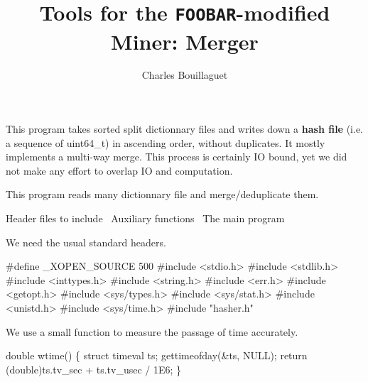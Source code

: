 \documentclass{article}%
\begin{document}
\title{Tools for the \texttt{FOOBAR}-modified Miner: Merger}
\author{Charles Bouillaguet}

\maketitle

This program takes sorted split dictionnary files and writes down a
\textbf{hash file} (i.e. a sequence of {\Tt{}uint64{\_}t\nwendquote}) in ascending order,
without duplicates. It mostly implements a multi-way merge. This process is
certainly IO bound, yet we did not make any effort to overlap IO and
computation.


This program reads many dictionnary file and merge/deduplicate them.

\nwenddocs{}\endmoddef\nwstartdeflinemarkup\nwenddeflinemarkup
\LA{}Header files to include~{\nwtagstyle{}}\RA{}
\LA{}Auxiliary functions~{\nwtagstyle{}}\RA{}
\LA{}The main program~{\nwtagstyle{}}\RA{}

\nwnotused{*}\nwendcode{}We need the usual standard headers.

\nwenddocs{}\endmoddef\nwstartdeflinemarkup{}\nwenddeflinemarkup
#define _XOPEN_SOURCE 500
#include <stdio.h>
#include <stdlib.h>
#include <inttypes.h>
#include <string.h>
#include <err.h>
#include <getopt.h>
#include <sys/types.h>
#include <sys/stat.h>
#include <unistd.h>
#include <sys/time.h>
#include "hasher.h"

\nwendcode{}We use a small function to measure the passage of time accurately.

\nwenddocs{}\endmoddef\nwstartdeflinemarkup{}\nwenddeflinemarkup
double wtime()
\{
        struct timeval ts;
        gettimeofday(&ts, NULL);
        return (double)ts.tv_sec + ts.tv_usec / 1E6;
\}
\end{document}
